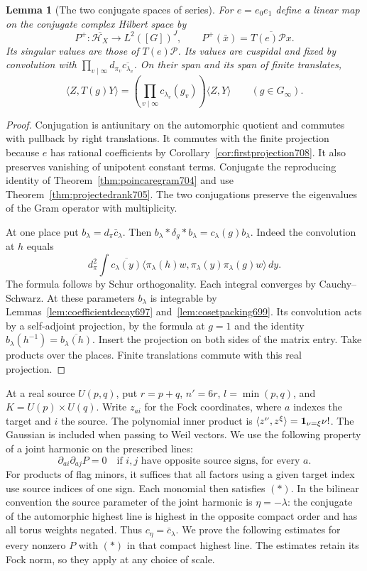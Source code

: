 \documentclass[a4paper,11pt]{article}
\newtheorem{lemma}[proposition]{Lemma}
\theoremstyle{definition}
\theoremstyle{remark}
\numberwithin{equation}{section}
\begin{document}
\begin{lemma}[The two conjugate spaces of series]\leavevmode
\label{lem:bilinearsource710}
For \(e=e_0e_1\) define a linear map on the conjugate
complex Hilbert space by
\[
      P^+:\overline{\mathcal H_X}\longrightarrow L^2([G])^J,
        \qquad P^+(\bar x)=\overline{T(e)\mathcal P x}.
\]
Its singular values are those of \(T(e)\mathcal P\).
Its values are cuspidal and fixed by convolution with
\(\prod_{v\mid\infty}d_{\pi_v}\overline{c_{\lambda_v}}\).
On their span and its span of finite translates,
\[
     \langle Z,T(g)Y\rangle
         =\left(\prod_{v\mid\infty}c_{\lambda_v}(g_v)\right)
                           \langle Z,Y\rangle \qquad(g\in G_\infty).
\]
\end{lemma}
\begin{proof}
Conjugation is antiunitary on the automorphic quotient and
commutes with pullback by right translations. It commutes with
the finite projection because \(e\) has rational coefficients
by Corollary~\ref{cor:firstprojection708}. It also preserves
vanishing of unipotent constant terms. Conjugate the
reproducing identity of Theorem~\ref{thm:poincaregram704} and
use Theorem~\ref{thm:projectedrank705}. The two conjugations
preserve the eigenvalues of the Gram operator with multiplicity.

At one place put \(b_\lambda=d_\pi\bar c_\lambda\). Then
\(b_\lambda*\delta_g*b_\lambda=c_\lambda(g)b_\lambda\).
Indeed the convolution at \(h\) equals
\[
 d_\pi^2\int\overline{c_\lambda(y)}
    \langle\pi_\lambda(h)w,\pi_\lambda(y)\pi_\lambda(g)w\rangle\,dy.
\]
The formula follows by Schur orthogonality. Each integral
converges by Cauchy--Schwarz. At these parameters \(b_\lambda\)
is integrable by Lemmas~\ref{lem:coefficientdecay697}
and~\ref{lem:cosetpacking699}. Its convolution acts by a
self-adjoint projection, by the formula at \(g=1\) and the
identity \(b_\lambda(h^{-1})=\overline{b_\lambda(h)}\).
Insert the projection on both sides of the matrix entry.
Take products over the places. Finite translations commute
with this real projection.
\end{proof}

At a real source \(U(p,q)\), put \(r=p+q\), \(n'=6r\),
\(l=\min(p,q)\), and \(K=U(p)\times U(q)\). Write \(z_{ai}\)
for the Fock coordinates, where \(a\) indexes the target
and \(i\) the source. The polynomial inner product is
\(\langle z^\nu,z^\xi\rangle={\bf1}_{\nu=\xi}\nu!\).
The Gaussian is included when passing to Weil vectors. We
use the following property of a joint harmonic on the
prescribed lines:
\[
       \partial_{ai}\partial_{aj}P=0
       \quad\text{if \(i,j\) have opposite source signs, for every \(a\)}.
       \tag{*}
\]
For products of flag minors, it suffices that all factors
using a given target index use source indices of one sign.
Each monomial then satisfies \((*)\). In the bilinear
convention the source parameter of the joint harmonic is
\(\eta=-\lambda\): the conjugate of the automorphic highest
line is highest in the opposite compact order and has all
torus weights negated. Thus \(c_\eta=\bar c_\lambda\).
We prove the following estimates for every nonzero \(P\)
with \((*)\) in that compact highest line. The estimates
retain its Fock norm, so they apply at any choice of scale.
\end{document}
